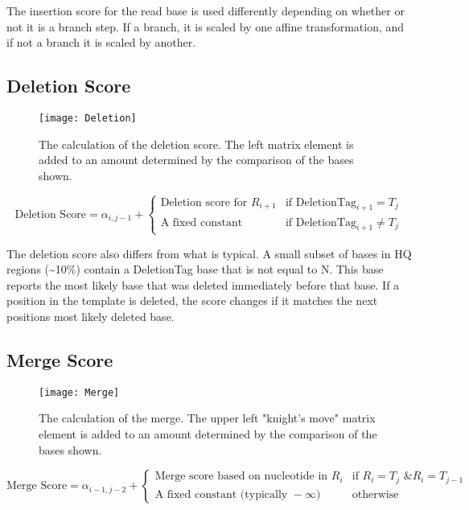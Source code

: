 \documentclass[paper=a4, fontsize=11pt]{scrartcl}
\numberwithin{equation}{section}		%
\numberwithin{figure}{section}			%
\numberwithin{table}{section}				%
\begin{document}
The insertion score for the read base is used differently depending on whether or not it is a branch step.  If a branch, it is scaled by one affine transformation, and if not a branch it is scaled by another.




\subsection{\textbf{Deletion Score}}

\begin{figure}[H] %
	\texttt{[image: Deletion]}
		\caption{The calculation of the deletion score.  The left matrix element is added to an amount determined by the comparison of the bases shown.}				
\end{figure}

\[
	\text{Deletion Score} = \alpha_{i,j-1}  +  \begin{cases}
							 \text{Deletion score  for } R_{i+1}  & \text{if }  \text{DeletionTag}_{i+1} = T_{j} \\
							 \text{A fixed constant} & \text{if }  \text{DeletionTag}_{i+1} \neq T_{j} 
							 \end{cases}
\]

The deletion score also differs from what is typical.  A small subset of bases in HQ regions (\textasciitilde10\%) contain a DeletionTag base that is not equal to N.  This base reports the most likely base that was deleted immediately before that base.  If a position in the template is deleted, the score changes if it matches the next positions most likely deleted base.




\subsection{\textbf{Merge Score}}
\begin{figure}[H] %
	\texttt{[image: Merge]}
		\caption{The calculation of the merge.  The upper left "knight's move" matrix element is added to an amount determined by the comparison of the bases shown.}				
\end{figure}

\[
	\text{Merge Score} = \alpha_{i-1,j-2}  +  \begin{cases}
							 \text{Merge score based on nucleotide in } R_{i}  & \text{if }  R_{i} = T_{j} \text{ \& } R_{i} = T_{j-1} \\
							 \text{A fixed constant (typically }-\infty\text{)} & \text{otherwise}
							 \end{cases}
\]
\end{document}
